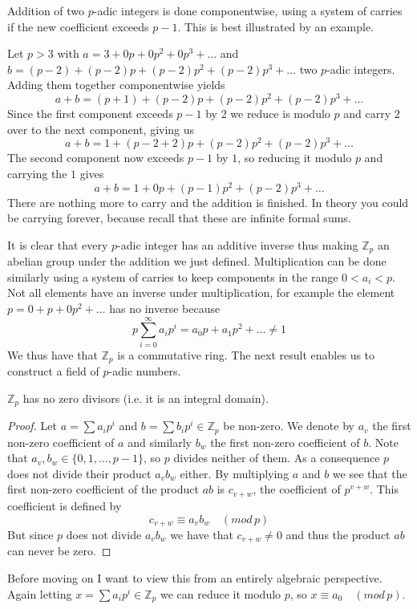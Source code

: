 Addition of two $p$-adic integers is done componentwise, using a system of carries if
the new coefficient exceeds $p-1$. This is best illustrated by an example.
\begin{ex}
 Let $p > 3$ with $a = 3 + 0p + 0p^2 + 0p^3 + \ldots$ and $b = (p-2) + (p-2)p + (p-2)p^2 + (p-2)p^3 + \ldots$
two $p$-adic integers. Adding them together componentwise yields
$$a+b = (p+1) + (p-2)p + (p-2)p^2 + (p-2)p^3 + \ldots$$
Since the first component exceeds $p-1$ by $2$ we reduce is modulo $p$ and carry $2$ over to the next
component, giving us
$$a+b = 1 + (p-2+2)p + (p-2)p^2 + (p-2)p^3 + \ldots$$
The second component now exceeds $p-1$ by $1$, so reducing it modulo $p$ and carrying the $1$ gives
$$a+b = 1 + 0p + (p-1)p^2 + (p-2)p^3 + \ldots$$
There are nothing more to carry and the addition is finished. In theory you could be carrying
forever, because recall that these are infinite formal sums.
\end{ex}
It is clear that every $p$-adic integer has an additive inverse thus making $\mathbb{Z}_p$ an
abelian group under the addition we just defined. Multiplication can be done similarly
using a system of carries to keep components in the range $0 < a_i < p$. Not all elements have
an inverse under multiplication, for example the element $p = 0 + p + 0p^2 + \ldots$ has no inverse because
$$ p\sum_{i=0}^{\infty} a_i p^i = a_0 p + a_1 p^2 + \ldots \neq 1$$
We thus have that $\mathbb{Z}_p$ is a commutative ring. The next result enables us to construct a field
of $p$-adic numbers.
\begin{prop}
 $\mathbb{Z}_p$ has no zero divisors (i.e. it is an integral domain).
\end{prop}
\begin{proof}
 Let $a = \sum a_i p^i$ and $b = \sum b_i p^i \in \mathbb{Z}_p$ be non-zero.
We denote by $a_v$ the first non-zero coefficient of $a$ and similarly $b_w$ the first non-zero
coefficient of $b$. Note that $a_v, b_w \in \{0, 1, \ldots , p-1\}$, so $p$ divides neither of them.
As a consequence $p$ does not divide their product $a_v b_w$ either. By multiplying $a$ and $b$
we see that the first non-zero coefficient of the product $ab$ is $c_{v+w}$, the coefficient of
$p^{v+w}$. This coefficient is defined by
$$ c_{v+w} \equiv a_v b_w \quad (mod\, p) $$
But since $p$ does not divide $a_v b_w$ we have that $c_{v+w} \neq 0$ and thus the product
$ab$ can never be zero.
\end{proof}
Before moving on I want to view this from an entirely algebraic perspective. Again letting
$x = \sum a_i p^i \in \mathbb{Z}_p$ we can reduce it modulo $p$, so $x \equiv a_0 \quad (mod\, p)$.
